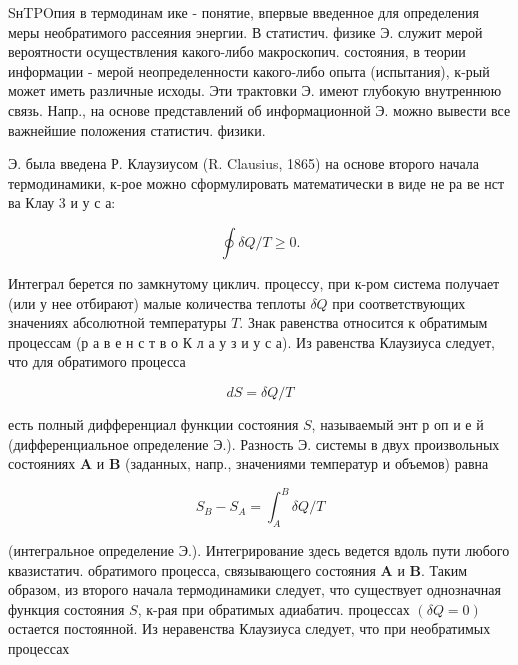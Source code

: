 \documentclass[10pt]{article}
\begin{document}
SнTPOпия в термодинам ике - понятие, впервые введенное для определения меры необратимого рассеяния энергии. В статистич. физике Э. служит мерой вероятности осуществления какого-либо макроскопич. состояния, в теории информации - мерой неопределенности какого-либо опыта (испытания), к-рый может иметь различные исходы. Эти трактовки Э. имеют глубокую внутреннюю связь. Напр., на основе представлений об информационной $Э$. можно вывести все важнейшие положения статистич. физики.



Э. была введена Р. Клаузиусом (R. Clausius, 1865) на основе второго начала термодинамики, к-рое можно сформулировать математически в виде не ра ве нст ва Клау 3 и у с а:



\[

\oint \delta Q / T \geqslant 0 .

\]



Интеграл берется по замкнутому циклич. процессу, при к-ром система получает (или у нее отбирают) малые количества теплоты $\delta Q$ при соответствующих значениях абсолютной температуры $T$. Знак равенства относится к обратимым процессам (р а в е н с т в о К л а у з и у с а). Из равенства Клаузиуса следует, что для обратимого процесса



\[

d S=\delta Q / T

\]



есть полный дифференциал функции состояния $S$, называемый энт р оп и е й (дифференциальное определение Э.). Разность Э. системы в двух произвольных состояниях $\boldsymbol{A}$ и $\boldsymbol{B}$ (заданных, напр., значениями температур и объемов) равна



\[

S_{B}-S_{A}=\int_{A}^{B} \delta Q / T

\]



(интегральное определение Э.). Интегрирование здесь ведется вдоль пути любого квазистатич. обратимого процесса, связывающего состояния $\boldsymbol{A}$ и $\boldsymbol{B}$. Таким образом, из второго начала термодинамики следует, что существует однозначная функция состояния $S$, к-рая при обратимых адиабатич. процессах $(\delta Q=0)$ остается постоянной. Из неравенства Клаузиуса следует, что при необратимых процессах
\end{document}
